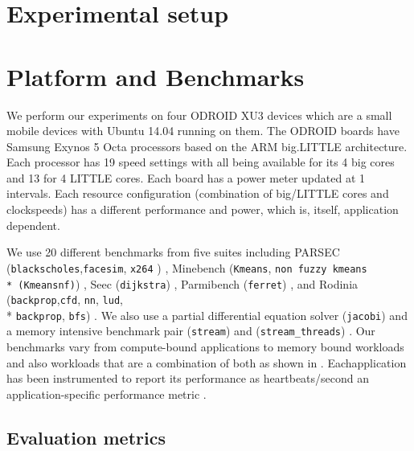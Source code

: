 \section{Experimental setup}

\section{Platform and Benchmarks}
We perform our experiments on four ODROID XU3 devices which are a
small mobile devices with Ubuntu 14.04 running on them. The ODROID
boards have Samsung Exynos 5 Octa processors based on the ARM
big.LITTLE architecture.  Each processor has 19 speed settings with
all being available for its 4 big cores and 13 for 4 LITTLE cores.
Each board has a power meter updated at 1 \ms intervals.  Each
resource configuration (combination of big/LITTLE cores and
clockspeeds) has a different performance and power, which is, itself,
application dependent.

We use 20 different benchmarks from five suites including PARSEC
(\texttt{blackscholes},\texttt{facesim}, \texttt{x264} )
\cite{parsec}, Minebench (\texttt{Kmeans}, \texttt{non fuzzy kmeans
  \\* (Kmeansnf)}) \cite{minebench}, Seec (\texttt{dijkstra})
\cite{seec}, Parmibench (\texttt{ferret}) \cite{parmibench}, and
Rodinia
(\texttt{backprop},\texttt{cfd}, \texttt{nn}, \texttt{lud}, \\*
\texttt{backprop}, \texttt{bfs}) \cite{rodinia}.  We also use a
partial differential equation solver (\texttt{jacobi}) and a memory
intensive benchmark pair (\texttt{stream}) and
(\texttt{stream\_threads}) \cite{stream}. Our benchmarks vary from
compute-bound applications to memory bound workloads and also
workloads that are a combination of both as shown in
.  Eachapplication has been instrumented
to report its performance as heartbeats/second an application-specific
performance metric \cite{POET}.



\subsection{Evaluation metrics}

